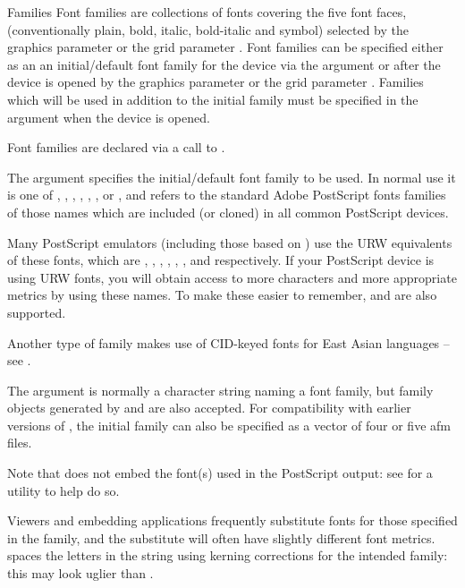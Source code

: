 %
\begin{Section}{Families}
Font families are collections of fonts covering the five font faces,
(conventionally plain, bold, italic, bold-italic and symbol) selected
by the graphics parameter  or the grid
parameter .  Font families can be
specified either as an an initial/default font family for the device
via the  argument or after the device is opened by
the graphics parameter  or the grid
parameter .  Families which will be
used in addition to the initial family must be specified in the
 argument when the device is opened.

Font families are declared via a call to .

The argument  specifies the initial/default font family
to be used.  In normal use it is one of ,
, , ,
, ,
 or , and refers to the standard Adobe
PostScript fonts families of those names which are included (or
cloned) in all common PostScript devices.

Many PostScript emulators (including those based on
) use the URW equivalents of these fonts, which are
, , ,
, , ,
 and  respectively.  If your
PostScript device is using URW fonts, you will obtain access to more
characters and more appropriate metrics by using these names.  To make
these easier to remember,  and
 are also supported.

Another type of family makes use of CID-keyed fonts for East Asian
languages -- see .

The  argument is normally a character string naming a
font family, but family objects generated by 
and  are also accepted.  For compatibility with
earlier versions of \R{}, the initial family can also be specified as a
vector of four or five afm files.

Note that \R{} does not embed the font(s) used in the PostScript output:
see  for a utility to help do so.

Viewers and embedding applications frequently substitute fonts for
those specified in the family, and the substitute will often have
slightly different font metrics.  spaces the
letters in the string using kerning corrections for the intended
family: this may look uglier than .
\end{Section}

